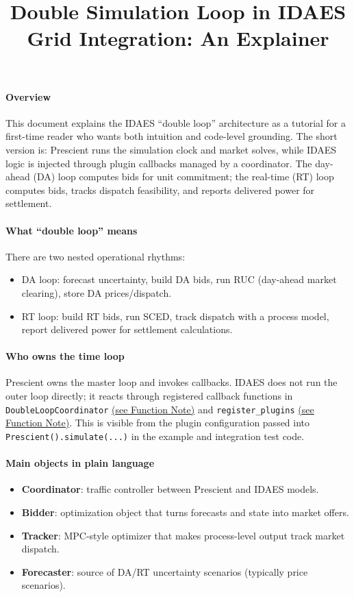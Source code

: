 \documentclass{article}
\title{Double Simulation Loop in IDAES Grid Integration: An Explainer}
\author{}
\date{}
\begin{document}
\maketitle

\paragraph{Overview}
This document explains the IDAES ``double loop'' architecture as a tutorial for a first-time reader who wants both intuition and code-level grounding. The short version is: Prescient runs the simulation clock and market solves, while IDAES logic is injected through plugin callbacks managed by a coordinator. The day-ahead (DA) loop computes bids for unit commitment; the real-time (RT) loop computes bids, tracks dispatch feasibility, and reports delivered power for settlement.

\paragraph{What ``double loop'' means}
There are two nested operational rhythms:
\begin{itemize}[leftmargin=*]
  \item DA loop: forecast uncertainty, build DA bids, run RUC (day-ahead market clearing), store DA prices/dispatch.
  \item RT loop: build RT bids, run SCED, track dispatch with a process model, report delivered power for settlement calculations.
\end{itemize}

\paragraph{Who owns the time loop}
Prescient owns the master loop and invokes callbacks. IDAES does not run the outer loop directly; it reacts through registered callback functions in \texttt{DoubleLoopCoordinator} \hyperref[fn:DoubleLoopCoordinator]{(see Function Note)} and \texttt{register\_plugins} \hyperref[fn:register_plugins]{(see Function Note)}. This is visible from the plugin configuration passed into \texttt{Prescient().simulate(...)} in the example and integration test code.

\paragraph{Main objects in plain language}
\begin{itemize}[leftmargin=*]
  \item \textbf{Coordinator}: traffic controller between Prescient and IDAES models.
  \item \textbf{Bidder}: optimization object that turns forecasts and state into market offers.
  \item \textbf{Tracker}: MPC-style optimizer that makes process-level output track market dispatch.
  \item \textbf{Forecaster}: source of DA/RT uncertainty scenarios (typically price scenarios).
\end{itemize}
\end{document}
